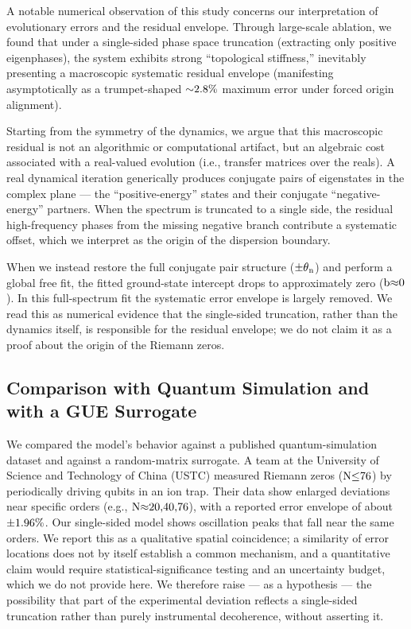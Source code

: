 \documentclass[fleqn,10pt]{wlscirep}
\begin{document}
A notable numerical observation of this study concerns our
interpretation of evolutionary errors and the residual envelope.
Through large-scale ablation, we found that under
a single-sided phase space truncation (extracting only positive
eigenphases), the system exhibits strong ``topological stiffness,''
inevitably presenting a macroscopic systematic residual envelope
(manifesting asymptotically as a trumpet-shaped \(\text{\ensuremath{\sim}2.8\%}\)
maximum error under forced origin alignment).

Starting from the symmetry of the dynamics, we argue that
this macroscopic residual is not an algorithmic or computational
artifact, but an algebraic cost associated with a real-valued
evolution (i.e., transfer matrices over the reals). A real
dynamical iteration generically produces conjugate pairs of
eigenstates in the complex plane --- the ``positive-energy'' states and
their conjugate ``negative-energy'' partners. When the spectrum is
truncated to a single side, the residual high-frequency phases from the
missing negative branch contribute a systematic offset, which we
interpret as the origin of the dispersion boundary.

When we instead restore the full conjugate pair structure
(\(\text{\ensuremath{\pm}}\text{\ensuremath{\theta}}_{\text{n}}\)) and perform a global free fit, the
fitted ground-state intercept drops to approximately zero
(\(\text{b}\text{\ensuremath{\approx}0}\)). In this full-spectrum fit the systematic error
envelope is largely removed. We read this as numerical evidence that the
single-sided truncation, rather than the dynamics itself, is responsible
for the residual envelope; we do not claim it as a proof about the origin
of the Riemann zeros.

\subsection*{Comparison with Quantum Simulation and with a GUE Surrogate}

We compared the model's behavior against a published quantum-simulation
dataset and against a random-matrix surrogate. A team at the University
of Science and Technology of China (USTC) measured Riemann zeros
(\(\text{N}\text{\ensuremath{\le}76}\)) by periodically driving qubits in an ion trap.
Their data show enlarged deviations near specific orders (e.g.,
\(\text{N}\text{\ensuremath{\approx}20,40,76}\)), with a reported error envelope of about
\(\text{\ensuremath{\pm}1.96\%}\). Our single-sided model shows oscillation peaks that
fall near the same orders. We report this as a qualitative spatial
coincidence; a similarity of error locations does not by itself
establish a common mechanism, and a quantitative claim would require
statistical-significance testing and an uncertainty budget, which we do
not provide here. We therefore raise --- as a hypothesis --- the
possibility that part of the experimental deviation reflects a
single-sided truncation rather than purely instrumental decoherence,
without asserting it.
\end{document}
